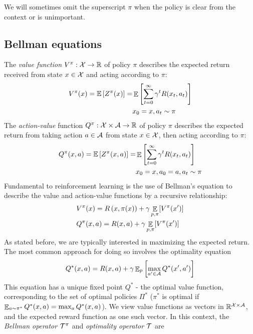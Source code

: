 We will sometimes omit the superscript $\pi$ when the policy is clear from the context or is unimportant.

\subsection{Bellman equations}

The \textit{value function} $V^\pi : \mathcal{X}\to\mathbb{R}$ of policy $\pi$ describes the expected return received from state $x \in \mathcal{X}$ and acting according to $\pi$:
\begin{equation}
\begin{split}
V^\pi(x) = \mathbb{E}\left[ { Z^\pi(x)} \right] =& \mathop{\mathbb{E}}\left[\sum_{t=0}^\infty \gamma^tR(x_t,a_t) \right]\\
&x_0 = x, a_t \sim \pi
\end{split}
\end{equation}
The \textit{action-value} function $Q^\pi : \mathcal{X}\times\mathcal{A}\to\mathbb{R}$ of policy $\pi$ describes the expected return from taking action $a \in \mathcal{A}$ from state $x \in \mathcal{X}$, then acting according to $\pi$:
\begin{equation}
\begin{split}
Q^\pi(x, a) = \mathbb{E}\left[ {Z^\pi(x, a)} \right] =& \mathop{\mathbb{E}}\left[ \sum_{t=0}^\infty \gamma^tR(x_t,a_t) \right]\\
&x_0 = x, a_0 = a, a_t \sim \pi
\end{split}
\end{equation}
Fundamental to reinforcement learning is the use of Bellman’s equation \citep{bellman1957markovian} to describe the value and action-value functions by a recursive relationship:
\begin{align}
&V^\pi(x) = R\left(x, \pi(x)\right) + \gamma \mathop{\mathbb{E}}\limits_{p, \pi}[ V^\pi(x')]\\
&Q^\pi(x, a) = R(x, a) + \gamma \mathop{\mathbb{E}}_{p, \pi}[ V^\pi(x')]
\end{align}
As stated before, we are typically interested in maximizing the expected return. The most common approach for doing so involves the optimality equation
\begin{equation}\label{eqn:q}
Q^*(x,a) = R(x,a) + \gamma \mathop{\mathbb{E}}\nolimits_p \left[ {\max_{a' \in \mathcal{A}} Q^*(x', a')} \right]
\end{equation}
This equation has a unique fixed point $Q^*$ -  the optimal value function, corresponding to the set of optimal policies $\Pi^*$ ($\pi^*$ is optimal if $\mathop{\mathbb{E}}_{a \sim \pi^*} Q^*(x, a) = \max_a Q^*(x,a)$).
We view value functions as vectors in $\mathbb{R}^{\mathcal{X} \times \mathcal{A}}$, and the expected reward function as one such vector. In this context, the \emph{Bellman operator} $\mathcal{T}^\pi$ and \emph{optimality operator} $\mathcal{T}$ are
